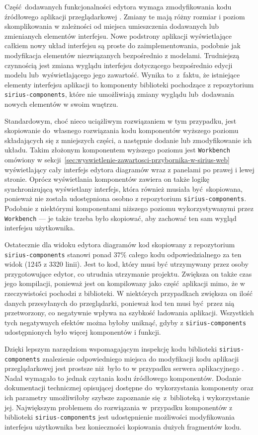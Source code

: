 Część dodawanych funkcjonalności edytora wymaga zmodyfikowania kodu źródłowego
aplikacji przeglądarkowej \SiriusWeb{}. Zmiany te mają różny rozmiar i
poziom skomplikowania w zależności od miejsca umieszczenia
dodawanych lub zmienianych elementów interfejsu.
Nowe podstrony aplikacji wyświetlające całkiem nowy układ interfejsu są proste
do zaimplementowania, podobnie jak modyfikacja elementów niezwiązanych
bezpośrednio z modelami. Trudniejszą czynnością jest zmiana wyglądu interfejsu
dotyczącego bezpośrednio edycji modelu lub~wyświetlającego jego zawartość.
Wynika to~z~faktu, że istniejące elementy interfejsu
aplikacji \SiriusWeb{} to komponenty biblioteki \React{} pochodzące z
repozytorium \texttt{sirius-components}, które nie umożliwiają zmiany wyglądu
lub~dodawania nowych elementów w swoim wnętrzu.

Standardowym, choć nieco uciążliwym rozwiązaniem w tym przypadku, jest
skopiowanie do~własnego rozwiązania kodu komponentów wyższego poziomu
składających
się z mniejszych
części, a następnie dodanie lub zmodyfikowanie ich układu. Takim złożonym
komponentem wyższego poziomu jest \texttt{Workbench} omówiony w
sekcji~\ref{sec:wyswietlenie-zawartosci-przybornika-w-sirius-web} wyświetlający
cały interfejs edytora diagramów wraz z panelami po prawej i lewej stronie.
Oprócz wyświetlania komponentów zawiera on także logikę synchronizującą
wyświetlany interfejs,
która również musiała być~skopiowana, ponieważ nie została udostępniona osobno
z repozytorium \texttt{sirius-components}. Podobnie z niektórymi komponentami
niższego poziomu wykorzystywanymi przez \texttt{Workbench} --- je także trzeba
było skopiować, aby zachować ten sam wygląd interfejsu użytkownika.

Ostatecznie dla widoku edytora diagramów kod skopiowany z repozytorium
\texttt{sirius-\allowbreak components} %
stanowi ponad $37\%$ całego kodu
odpowiedzialnego za ten widok (1245 z 3320 linii). Jest to kod, który musi być
utrzymywany przez osoby przygotowujące edytor, co utrudnia utrzymanie projektu.
Zwiększa on także czas jego kompilacji, ponieważ jest on kompilowany jako
część aplikacji mimo, że w rzeczywistości pochodzi z biblioteki. W niektórych
przypadkach zwiększa on ilość danych przesyłanych do przeglądarki, ponieważ kod
ten musi być przez nią przetworzony, co negatywnie wpływa na szybkość ładowania
aplikacji. Wszystkich tych negatywnych efektów można byłoby uniknąć, gdyby z
\texttt{sirius-components} udostępnionych było więcej komponentów i funkcji.

Dzięki lepszym narzędziom wspomagającym inspekcję kodu biblioteki
\texttt{sirius-components} znalezienie odpowiedniego miejsca do modyfikacji
kodu aplikacji przeglądarkowej jest prostsze niż było to w przypadku serwera
aplikacyjnego \SiriusWeb{}. Nadal wymagało to jednak czytania kodu źródłowego
komponentów. Dodanie dokumentacji technicznej
opisującej dostępne do~wykorzystania komponenty oraz ich parametry umożliwiłoby
szybsze zapoznanie się~z~biblioteką i wykorzystanie jej. Największym problemem
do rozwiązania w~przypadku komponentów z biblioteki \texttt{sirius-components}
jest udostępnienie możliwości modyfikowania interfejsu użytkownika
bez konieczności kopiowania dużych fragmentów kodu.

